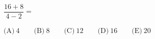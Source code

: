$\dfrac{16+8}{4-2}=$



$\text{(A)}\ 4 \qquad \text{(B)}\ 8 \qquad \text{(C)}\ 12 \qquad \text{(D)}\ 16 \qquad \text{(E)}\ 20$
